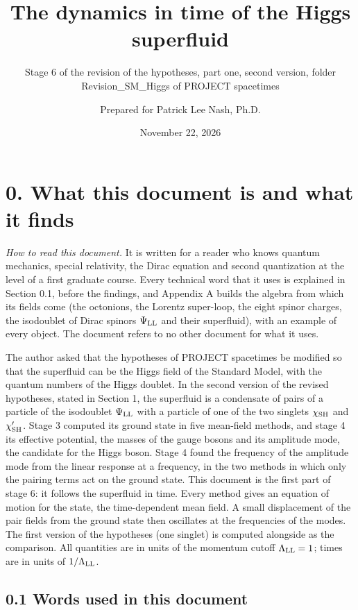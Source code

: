 \documentclass[
  10pt,
]{article}
\title{The dynamics in time of the Higgs superfluid}
\subtitle{Stage 6 of the revision of the hypotheses, part one, second
version, folder Revision\_SM\_Higgs of PROJECT spacetimes}
\author{Prepared for Patrick Lee Nash, Ph.D.}
\date{November 22, 2026}
\begin{document}
\maketitle

\hypertarget{what-this-document-is-and-what-it-finds}{%
\section{0. What this document is and what it
finds}\label{what-this-document-is-and-what-it-finds}}

\emph{How to read this document.} It is written for a reader who knows
quantum mechanics, special relativity, the Dirac equation and second
quantization at the level of a first graduate course. Every technical
word that it uses is explained in Section 0.1, before the findings, and
Appendix A builds the algebra from which its fields come (the octonions,
the Lorentz super-loop, the eight spinor charges, the isodoublet of
Dirac spinors \(\Psi_{\rm LL}\) and their superfluid), with an example
of every object. The document refers to no other document for what it
uses.

The author asked that the hypotheses of PROJECT spacetimes be modified
so that the superfluid can be the Higgs field of the Standard Model,
with the quantum numbers of the Higgs doublet. In the second version of
the revised hypotheses, stated in Section 1, the superfluid is a
condensate of pairs of a particle of the isodoublet \(\Psi_{\rm LL}\)
with a particle of one of the two singlets \(\chi_{\rm SH}\) and
\(\chi'_{\rm SH}\). Stage 3 computed its ground state in five mean-field
methods, and stage 4 its effective potential, the masses of the gauge
bosons and its amplitude mode, the candidate for the Higgs boson. Stage
4 found the frequency of the amplitude mode from the linear response at
a frequency, in the two methods in which only the pairing terms act on
the ground state. This document is the first part of stage 6: it follows
the superfluid in time. Every method gives an equation of motion for the
state, the time-dependent mean field. A small displacement of the pair
fields from the ground state then oscillates at the frequencies of the
modes. The first version of the hypotheses (one singlet) is computed
alongside as the comparison. All quantities are in units of the momentum
cutoff \(\Lambda_{\rm LL}=1\); times are in units of
\(1/\Lambda_{\rm LL}\).

\hypertarget{words-used-in-this-document}{%
\subsection{0.1 Words used in this
document}\label{words-used-in-this-document}}
\end{document}
